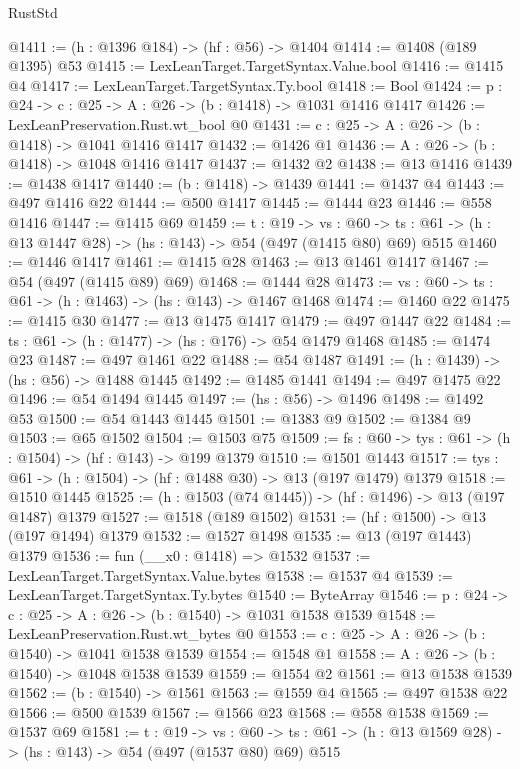 \begin{lexlean}{RustStd}
\begin{coremodule}
{\begin{coremodule}
{{{{{{{{{{{{@1411 := (h : @1396 @184) -> (hf : @56) -> @1404
@1414 := @1408 (@189 @1395) @53
@1415 := LexLeanTarget.TargetSyntax.Value.bool
@1416 := @1415 @4
@1417 := LexLeanTarget.TargetSyntax.Ty.bool
@1418 := Bool
@1424 := {p : @24} -> {c : @25} -> {A : @26} -> (b : @1418) -> @1031 @1416 @1417
@1426 := LexLeanPreservation.Rust.wt_bool @0
@1431 := {c : @25} -> {A : @26} -> (b : @1418) -> @1041 @1416 @1417
@1432 := @1426 @1
@1436 := {A : @26} -> (b : @1418) -> @1048 @1416 @1417
@1437 := @1432 @2
@1438 := @13 @1416
@1439 := @1438 @1417
@1440 := (b : @1418) -> @1439
@1441 := @1437 @4
@1443 := @497 @1416 @22
@1444 := @500 @1417
@1445 := @1444 @23
@1446 := @558 @1416
@1447 := @1415 @69
@1459 := {t : @19} ->
  {vs : @60} -> {ts : @61} -> (h : @13 @1447 @28) -> (hs : @143) -> @54 (@497 (@1415 @80) @69) @515
@1460 := @1446 @1417
@1461 := @1415 @28
@1463 := @13 @1461 @1417
@1467 := @54 (@497 (@1415 @89) @69)
@1468 := @1444 @28
@1473 := {vs : @60} -> {ts : @61} -> (h : @1463) -> (hs : @143) -> @1467 @1468
@1474 := @1460 @22
@1475 := @1415 @30
@1477 := @13 @1475 @1417
@1479 := @497 @1447 @22
@1484 := {ts : @61} -> (h : @1477) -> (hs : @176) -> @54 @1479 @1468
@1485 := @1474 @23
@1487 := @497 @1461 @22
@1488 := @54 @1487
@1491 := (h : @1439) -> (hs : @56) -> @1488 @1445
@1492 := @1485 @1441
@1494 := @497 @1475 @22
@1496 := @54 @1494 @1445
@1497 := (hs : @56) -> @1496
@1498 := @1492 @53
@1500 := @54 @1443 @1445
@1501 := @1383 @9
@1502 := @1384 @9
@1503 := @65 @1502
@1504 := @1503 @75
@1509 := {fs : @60} -> {tys : @61} -> (h : @1504) -> (hf : @143) -> @199 @1379
@1510 := @1501 @1443
@1517 := {tys : @61} -> (h : @1504) -> (hf : @1488 @30) -> @13 (@197 @1479) @1379
@1518 := @1510 @1445
@1525 := (h : @1503 (@74 @1445)) -> (hf : @1496) -> @13 (@197 @1487) @1379
@1527 := @1518 (@189 @1502)
@1531 := (hf : @1500) -> @13 (@197 @1494) @1379
@1532 := @1527 @1498
@1535 := @13 (@197 @1443) @1379
@1536 := fun (__x0 : @1418) => @1532
@1537 := LexLeanTarget.TargetSyntax.Value.bytes
@1538 := @1537 @4
@1539 := LexLeanTarget.TargetSyntax.Ty.bytes
@1540 := ByteArray
@1546 := {p : @24} -> {c : @25} -> {A : @26} -> (b : @1540) -> @1031 @1538 @1539
@1548 := LexLeanPreservation.Rust.wt_bytes @0
@1553 := {c : @25} -> {A : @26} -> (b : @1540) -> @1041 @1538 @1539
@1554 := @1548 @1
@1558 := {A : @26} -> (b : @1540) -> @1048 @1538 @1539
@1559 := @1554 @2
@1561 := @13 @1538 @1539
@1562 := (b : @1540) -> @1561
@1563 := @1559 @4
@1565 := @497 @1538 @22
@1566 := @500 @1539
@1567 := @1566 @23
@1568 := @558 @1538
@1569 := @1537 @69
@1581 := {t : @19} ->
  {vs : @60} -> {ts : @61} -> (h : @13 @1569 @28) -> (hs : @143) -> @54 (@497 (@1537 @80) @69) @515
}}}}}}}}}}}}
\end{coremodule}}
\end{coremodule}
\end{lexlean}
